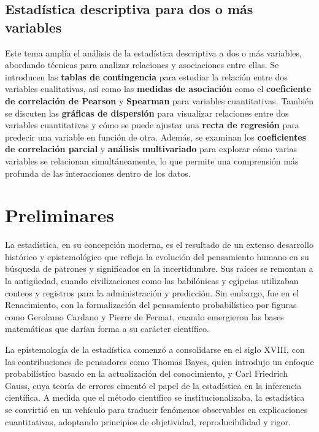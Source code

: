 \documentclass[
  letterpaper,
  DIV=11,
  numbers=noendperiod]{scrreprt}
\begin{document}
\section*{Estadística descriptiva para dos o más
variables}\label{estaduxedstica-descriptiva-para-dos-o-muxe1s-variables}


Este tema amplía el análisis de la estadística descriptiva a dos o más
variables, abordando técnicas para analizar relaciones y asociaciones
entre ellas. Se introducen las \textbf{tablas de contingencia} para
estudiar la relación entre dos variables cualitativas, así como las
\textbf{medidas de asociación} como el \textbf{coeficiente de
correlación de Pearson} y \textbf{Spearman} para variables
cuantitativas. También se discuten las \textbf{gráficas de dispersión}
para visualizar relaciones entre dos variables cuantitativas y cómo se
puede ajustar una \textbf{recta de regresión} para predecir una variable
en función de otra. Además, se examinan los \textbf{coeficientes de
correlación parcial} y \textbf{análisis multivariado} para explorar cómo
varias variables se relacionan simultáneamente, lo que permite una
comprensión más profunda de las interacciones dentro de los datos.

\chapter{Preliminares}\label{preliminares}

La estadística, en su concepción moderna, es el resultado de un extenso
desarrollo histórico y epistemológico que refleja la evolución del
pensamiento humano en su búsqueda de patrones y significados en la
incertidumbre. Sus raíces se remontan a la antigüedad, cuando
civilizaciones como las babilónicas y egipcias utilizaban conteos y
registros para la administración y predicción. Sin embargo, fue en el
Renacimiento, con la formalización del pensamiento probabilístico por
figuras como Gerolamo Cardano y Pierre de Fermat, cuando emergieron las
bases matemáticas que darían forma a su carácter científico.

La epistemología de la estadística comenzó a consolidarse en el siglo
XVIII, con las contribuciones de pensadores como Thomas Bayes, quien
introdujo un enfoque probabilístico basado en la actualización del
conocimiento, y Carl Friedrich Gauss, cuya teoría de errores cimentó el
papel de la estadística en la inferencia científica. A medida que el
método científico se institucionalizaba, la estadística se convirtió en
un vehículo para traducir fenómenos observables en explicaciones
cuantitativas, adoptando principios de objetividad, reproducibilidad y
rigor.
\end{document}
